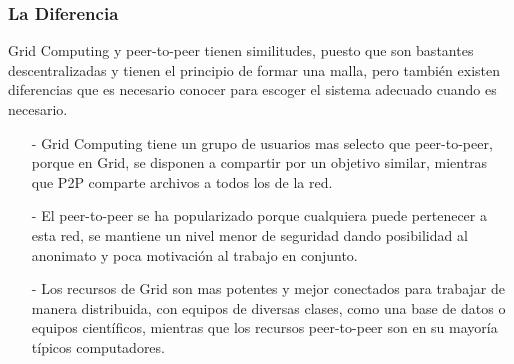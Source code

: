 \documentclass[12pt]{article}
\begin{document}
{{\subsubsection{La Diferencia}
Grid Computing y peer-to-peer tienen similitudes, puesto que son bastantes descentralizadas y tienen el principio de formar una malla, pero tambi\'en existen diferencias que es necesario conocer para escoger el sistema adecuado cuando es necesario.\\
\begin{itemize}
\item[-]Grid Computing tiene un grupo de usuarios mas selecto que peer-to-peer, porque en Grid, se disponen a compartir por un objetivo similar, mientras que P2P comparte archivos a todos los de la red.
\item[-]El peer-to-peer se ha popularizado porque cualquiera puede pertenecer a esta red, se mantiene un nivel menor de seguridad dando posibilidad al anonimato y poca motivaci\'on al trabajo en conjunto.
\item[-]Los recursos de Grid son mas potentes y mejor conectados para trabajar de manera distribuida, con equipos de diversas clases, como una base de datos o equipos cient\'ificos, mientras que los recursos peer-to-peer son en su mayor\'ia t\'ipicos computadores.
\end{itemize}
}

\newpage
{\raggedright
}}
\end{document}
